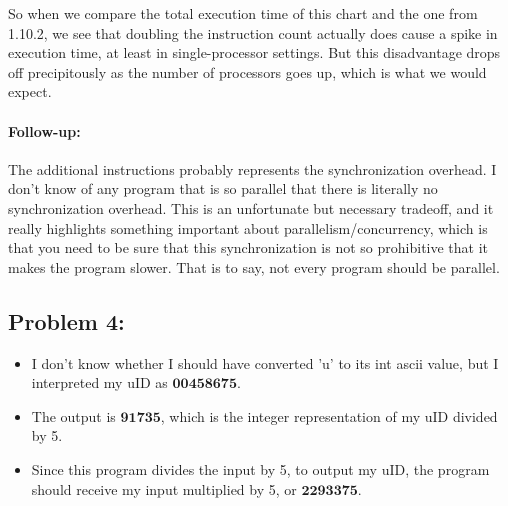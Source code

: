 \documentclass[a4paper]{article}
\begin{document}
So when we compare the total execution time of this chart and the one from 1.10.2, we see that doubling the instruction count actually does cause a spike in execution time, at least in single-processor settings. But this disadvantage drops off precipitously as the number of processors goes up, which is what we would expect.

\paragraph*{Follow-up:} The additional instructions probably represents the synchronization overhead. I don't know of any program that is so parallel that there is literally no synchronization overhead. This is an unfortunate but necessary tradeoff, and it really highlights something important about parallelism/concurrency, which is that you need to be sure that this synchronization is not so prohibitive that it makes the program slower. That is to say, not every program should be parallel.

\subsection*{Problem 4:}
\begin{itemize}
	\item I don't know whether I should have converted 'u' to its int ascii value, but I interpreted my uID as $\mathbf{00458675}$.
	\item The output is $\mathbf{91735}$, which is the integer representation of my uID divided by 5.
	\item Since this program divides the input by 5, to output my uID, the program should receive my input  multiplied by 5, or $\mathbf{2293375}$.
\end{itemize}
\end{document}
